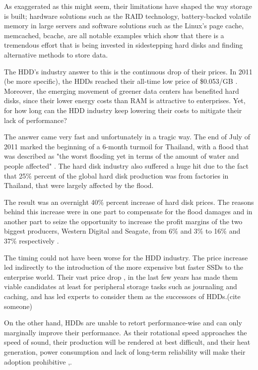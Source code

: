 As exaggerated as this might seem, their limitations have shaped the way 
storage is built; hardware solutions such as the RAID technology, 
battery-backed volatile memory in large servers and software solutions such as 
the Linux's page cache, memcached, bcache, are all notable examples which show 
that there is a tremendous effort that is being invested in sidestepping hard 
disks and finding alternative methods to store data.

The HDD's industry answer to this is the continuous drop of their prices.  In 
2011 (\fixme be more specific), the HDDs reached their all-time low price of 
\$0.053/GB \cite{hdd-price}. Moreover, the emerging movement of greener data 
centers has benefited hard disks, since their lower energy costs than RAM is 
attractive to enterprises. Yet, for how long can the HDD industry keep lowering 
their costs to mitigate their lack of performance?

The answer came very fast and unfortunately in a tragic way. The end of July of 
2011 marked the beginning of a 6-month turmoil for Thailand, with a flood that 
was described as "the worst flooding yet in terms of the amount of water and 
people affected" \cite{flood}. The hard disk industry also suffered a huge hit 
due to the fact that 25\% percent of the global hard disk production was from 
factories in Thailand, that were largely affected by the flood.

The result was an overnight 40\% percent increase of hard disk prices. The 
reasons behind this increase were in one part to compensate for the flood 
damages and in another part to seize the opportunity to increase the profit 
margins of the two biggest producers, Western Digital and Seagate, from 6\% and 
3\% to 16\% and 37\% respectively \cite{rosenthal12-unesco}.

The timing could not have been worse for the HDD industry. The price increase 
led indirectly to the introduction of the more expensive but faster SSDs to the 
enterprise world. Their vast price drop \cite{ssd-price},\cite{ssddrop} in the 
last few years has made them viable candidates at least for peripheral storage 
tasks such as journaling and caching, and has led experts to consider them as 
the successors of HDDs.(\fixme cite someone)

On the other hand, HDDs are unable to retort performance-wise and can only 
marginally improve their performance.  As their rotational speed approaches the 
speed of sound, their production will be rendered at best difficult, and their 
heat generation, power consumption and lack of long-term reliability will make 
their adoption prohibitive \cite{hddtrends},\cite{speed-of-sound}.

